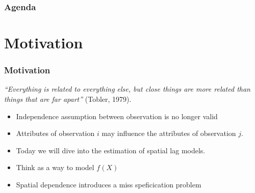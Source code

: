 \documentclass[
  shownotes,
  xcolor={svgnames},
  hyperref={colorlinks,citecolor=DarkBlue,linkcolor=DarkRed,urlcolor=DarkBlue}
  ]{beamer}
\begin{document}

\begin{frame}
\frametitle{Agenda}

\tableofcontents

\end{frame}




\section{Motivation }
\begin{frame}[fragile]
\frametitle{Motivation}


{\it “Everything is related to everything else, but close things are more related than things that are far apart”} (Tobler, 1979).

\bigskip

\begin{itemize}
  
  \item Independence assumption between observation is no longer valid
  \medskip
  \item Attributes of observation $i$  may influence the attributes of observation $j$.
  \medskip
  \item Today we will dive into the estimation of spatial lag models.
  \medskip
  \item Think as a way to model $f(X)$
  \medskip
  \item Spatial dependence introduces a miss speficication problem
\end{itemize}



\end{frame}
\end{document}
